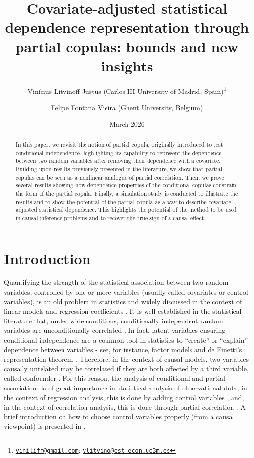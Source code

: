 \documentclass[
]{article}
\title{Covariate-adjusted statistical dependence representation through
partial copulas: bounds and new insights}
\author{Vinícius Litvinoff Justus (Carlos III University of Madrid,
Spain)\footnote{\href{mailto:viniliff@gmail.com}{\nolinkurl{viniliff@gmail.com}};
  \href{mailto:vlitvino@est-econ.uc3m.es}{\nolinkurl{vlitvino@est-econ.uc3m.es}}} \and Felipe
Fontana Vieira (Ghent University, Belgium)}
\date{March 2026}
\begin{document}
\maketitle
\begin{abstract}
In this paper, we revisit the notion of partial copula, originally
introduced to test conditional independence, highlighting its capability
to represent the dependence between two random variables after removing
their dependence with a covariate. Building upon results previously
presented in the literature, we show that partial copulas can be seen as
a nonlinear analogue of partial correlation. Then, we prove several
results showing how dependence properties of the conditional copulas
constrain the form of the partial copula. Finally, a simulation study is
conducted to illustrate the results and to show the potential of the
partial copula as a way to describe covariate-adjusted statistical
dependence. This highlights the potential of the method to be used in
causal inference problems and to recover the true sign of a causal
effect.
\end{abstract}

\section{Introduction}\label{introduction}

Quantifying the strength of the statistical association between two
random variables, controlled by one or more variables (usually called
covariates or control variables), is an old problem in statistics and
widely discussed in the context of linear models and regression
coefficients \citep{kutner2005, baba2004, kim2015}. It is well
established in the statistical literature that, under wide conditions,
conditionally independent random variables are unconditionally
correlated \citep[see theorem 2 in][]{oneill2009}. In fact, latent
variables ensuring conditional independence are a common tool in
statistics to ``create'' or ``explain'' dependence between variables -
see, for instance, factor models \citep{joe2014, Bork2017, Nguyen2020}
and de Finetti's representation theorem \citep{oneill2009}. Therefore,
in the context of causal models, two variables causally unrelated may be
correlated if they are both affected by a third variable, called
confounder \citep{pearl2009, pearl2016}. For this reason, the analysis
of conditional and partial associations is of great importance in
statistical analysis of observational data; in the context of regression
analysis, this is done by adding control variables \citep{kutner2005},
and, in the context of correlation analysis, this is done through
partial correlation \citep{baba2004, kim2015}. A brief introduction on
how to choose control variables properly (from a causal viewpoint) is
presented in \citet{cinelli2022}.
\end{document}

